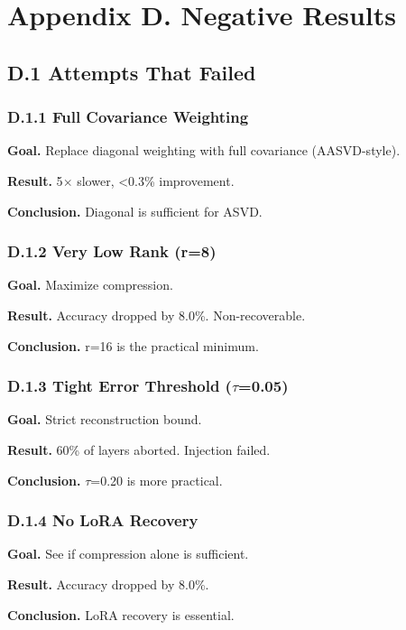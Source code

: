 
\section{Appendix D. Negative Results}

\subsection{D.1 Attempts That Failed}

\subsubsection{D.1.1 Full Covariance Weighting}

\textbf{Goal.} Replace diagonal weighting with full covariance (AASVD-style).

\textbf{Result.} 5$\times$ slower, <0.3\% improvement.

\textbf{Conclusion.} Diagonal is sufficient for ASVD.

\subsubsection{D.1.2 Very Low Rank (r=8)}

\textbf{Goal.} Maximize compression.

\textbf{Result.} Accuracy dropped by 8.0\%. Non-recoverable.

\textbf{Conclusion.} r=16 is the practical minimum.

\subsubsection{D.1.3 Tight Error Threshold ($\tau$=0.05)}

\textbf{Goal.} Strict reconstruction bound.

\textbf{Result.} 60\% of layers aborted. Injection failed.

\textbf{Conclusion.} $\tau$=0.20 is more practical.

\subsubsection{D.1.4 No LoRA Recovery}

\textbf{Goal.} See if compression alone is sufficient.

\textbf{Result.} Accuracy dropped by 8.0\%.

\textbf{Conclusion.} LoRA recovery is essential.

